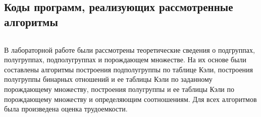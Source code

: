 \documentclass[bachelor, och, labwork]{shiza}
\begin{document}
        
    \subsection{Коды программ, реализующих рассмотренные алгоритмы}
        \inputminted{python}{code/lab4.py}
      

\conclusion
В лабораторной работе были рассмотрены теоретические сведения о подгруппах, 
полугруппах, подполугруппах и порождающем множестве. На их основе были составлены 
алгоритмы построения подполугруппы по таблице Кэли, построения полугруппы бинарных 
отношений и ее таблицы Кэли по заданному порождающему множеству, построения 
полугруппы и ее таблицы Кэли по порождающему множеству и определяющим соотношениям. 
Для всех алгоритмов была произведена оценка трудоемкости. 
\end{document}
